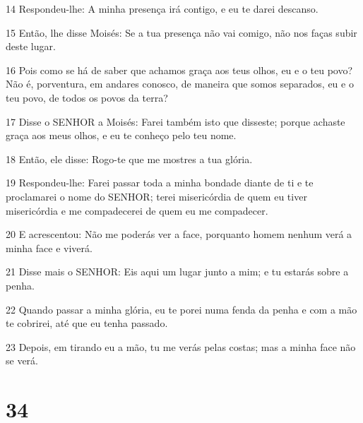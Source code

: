 \par 14 Respondeu-lhe: A minha presença irá contigo, e eu te darei descanso.
\par 15 Então, lhe disse Moisés: Se a tua presença não vai comigo, não nos faças subir deste lugar.
\par 16 Pois como se há de saber que achamos graça aos teus olhos, eu e o teu povo? Não é, porventura, em andares conosco, de maneira que somos separados, eu e o teu povo, de todos os povos da terra?
\par 17 Disse o SENHOR a Moisés: Farei também isto que disseste; porque achaste graça aos meus olhos, e eu te conheço pelo teu nome.
\par 18 Então, ele disse: Rogo-te que me mostres a tua glória.
\par 19 Respondeu-lhe: Farei passar toda a minha bondade diante de ti e te proclamarei o nome do SENHOR; terei misericórdia de quem eu tiver misericórdia e me compadecerei de quem eu me compadecer.
\par 20 E acrescentou: Não me poderás ver a face, porquanto homem nenhum verá a minha face e viverá.
\par 21 Disse mais o SENHOR: Eis aqui um lugar junto a mim; e tu estarás sobre a penha.
\par 22 Quando passar a minha glória, eu te porei numa fenda da penha e com a mão te cobrirei, até que eu tenha passado.
\par 23 Depois, em tirando eu a mão, tu me verás pelas costas; mas a minha face não se verá.

\chapter{34}


